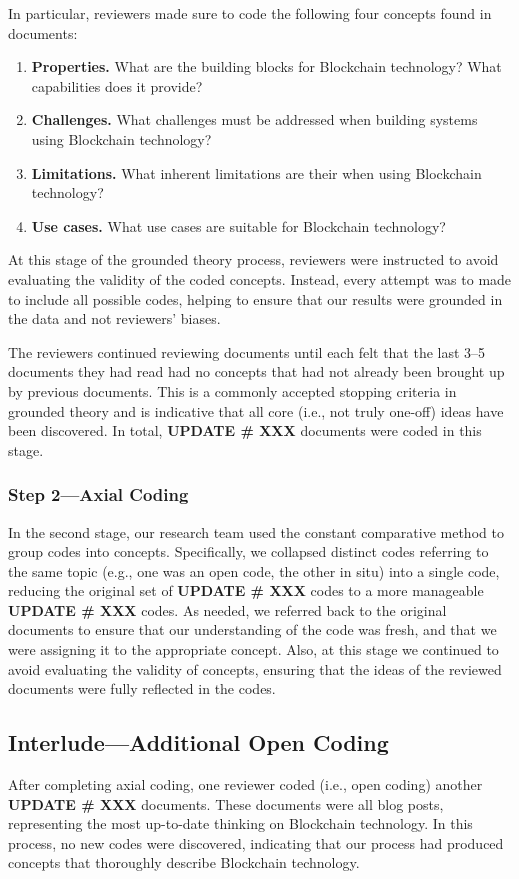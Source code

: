 In particular, reviewers made sure to code the following four concepts found in documents:
\begin{enumerate}
	\item \textbf{Properties.} What are the building blocks for Blockchain technology? What capabilities does it provide?
	\item \textbf{Challenges.} What challenges must be addressed when building systems using Blockchain technology?
	\item \textbf{Limitations.} What inherent limitations are their when using Blockchain technology?
	\item \textbf{Use cases.} What use cases are suitable for Blockchain technology?
\end{enumerate}

At this stage of the grounded theory process, reviewers were instructed to avoid evaluating the validity of the coded concepts.
Instead, every attempt was to made to include all possible codes, helping to ensure that our results were grounded in the data and not reviewers' biases.

The reviewers continued reviewing documents until each felt that the last 3--5 documents they had read had no concepts that had not already been brought up by previous documents.
This is a commonly accepted stopping criteria in grounded theory and is indicative that all core (i.e., not truly one-off) ideas have been discovered.
In total, \textbf{UPDATE \# XXX} documents were coded in this stage.

\subsubsection{Step 2---Axial Coding}
In the second stage, our research team used the constant comparative method to group codes into concepts.
Specifically, we collapsed distinct codes referring to the same topic (e.g., one was an open code, the other in situ) into a single code, reducing the original set of \textbf{UPDATE \# XXX} codes to a more manageable \textbf{UPDATE \# XXX} codes.
As needed, we referred back to the original documents to ensure that our understanding of the code was fresh, and that we were assigning it to the appropriate concept.
Also, at this stage we continued to avoid evaluating the validity of concepts, ensuring that the ideas of the reviewed documents were fully reflected in the codes.

\subsection{Interlude---Additional Open Coding}
After completing axial coding, one reviewer coded (i.e., open coding) another \textbf{UPDATE \# XXX} documents.
These documents were all blog posts, representing the most up-to-date thinking on Blockchain technology.
In this process, no new codes were discovered, indicating that our process had produced concepts that thoroughly describe Blockchain technology.

